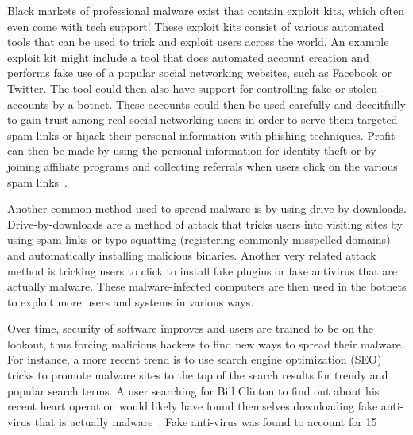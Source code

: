Black markets of professional malware exist that contain exploit kits, which often even come with tech support\cite{paxson_sellingviagra_2009}! These exploit kits consist of various automated tools that can be used to trick and exploit users across the world. An example exploit kit might include a tool that does automated account creation and performs fake use of a popular social networking websites, such as Facebook or Twitter. The tool could then also have support for controlling fake or stolen accounts by a botnet. These accounts could then be used carefully and deceitfully to gain trust among real social networking users in order to serve them targeted spam links or hijack their personal information with phishing techniques. Profit can then be made by using the personal information for identity theft or by joining affiliate programs and collecting referrals when users click on the various spam links~\cite{paxson_sellingviagra_2009}.

Another common method used to spread malware is by using drive-by-downloads. Drive-by-downloads are a method of attack that tricks users into visiting sites by using spam links or typo-squatting (registering commonly misspelled domains) and automatically installing malicious binaries. Another very related attack method is tricking users to click to install fake plugins or fake antivirus that are actually malware\cite{provos_2007}. These malware-infected computers are then used in the botnets to exploit more users and systems in various ways.

Over time, security of software improves and users are trained to be on the lookout, thus forcing malicious hackers to find new ways to spread their malware. For instance, a more recent trend is to use search engine optimization (SEO) tricks to promote malware sites to the top of the search results for trendy and popular search terms. A user searching for Bill Clinton to find out about his recent heart operation would likely have found themselves downloading fake anti-virus that is actually malware~\cite{eWeek_2010}. Fake anti-virus was found to account for 15%

